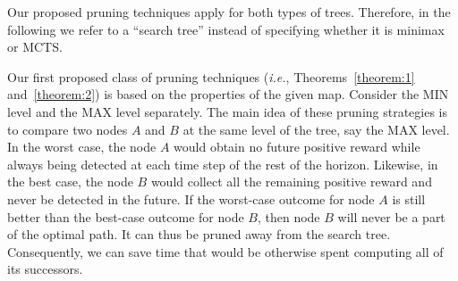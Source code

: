 \documentclass[10 pt, conference]{ieeeconf}
\newcommand{\pcomment}{\textcolor{red}}%
\newcommand{\ie}{\emph{i.e.}}
\begin{document}


 

 

Our proposed pruning techniques apply for both types of trees. Therefore, in the following we refer to a ``search tree'' instead of specifying whether it is minimax or MCTS.

Our first proposed class of pruning techniques (\ie, Theorems~\ref{theorem:1} and~\ref{theorem:2}) is based on the properties of the given map. Consider the MIN level and the MAX level separately. The main idea of these pruning strategies is to compare two nodes $A$ and $B$ at the same level of the tree, say the MAX level. In the worst case, the node $A$ would obtain no future positive reward while always being detected at each time step of the rest of the horizon. Likewise, in the best case, the node $B$ would collect all the remaining positive reward and never be detected in the future. If the worst-case outcome for node $A$ is still better than the best-case outcome for node $B$, then node $B$ will never be a part of the optimal path. It can thus be pruned away from the search tree. Consequently, we can save time that would be otherwise spent computing all of its successors. 
\end{document}
